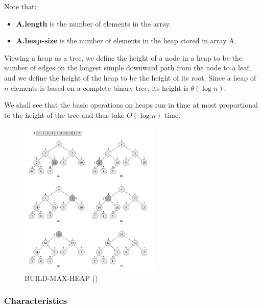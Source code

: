 Note that:
\begin{itemize}
    \item \textbf{A.length} is the number of elements in the array.
    \item \textbf{A.heap-size} is the number of elements in the heap stored in array A.
\end{itemize}


Viewing a heap as a tree, we define the height of a node in a heap to be the
number of edges on the longest simple downward path from the node to a leaf, and
we define the height of the heap to be the height of its root. Since a heap of $n$ elements is based on a complete binary tree, its height is $\theta(\log n)$.

We shall see that the basic operations on heaps run in time at most proportional
to the height of the tree and thus take $O(\log n)$ time.

\begin{figure}[H]
    \centering
    \includegraphics[width=0.6\textwidth]{assets/heapsort.png}
    \caption{BUILD-MAX-HEAP (\cite{cormen2022introduction})}
\end{figure}

\subsubsection*{Characteristics}


